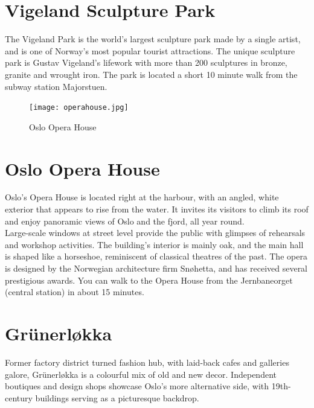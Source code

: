 \documentclass{article}
\begin{document}
\section*{Vigeland Sculpture Park} 

The Vigeland Park is the world's largest sculpture park made by a single artist, and is one of Norway's most popular tourist attractions. The unique sculpture park is Gustav Vigeland's lifework with more than 200 sculptures in bronze, granite and wrought iron. The park is located a short 10 minute walk from the subway station Majorstuen.

\begin{figure}
    \centering
    \texttt{[image: operahouse.jpg]}%
     \caption*{Oslo Opera House }
\end{figure}

\vspace{1cm}

\section*{Oslo Opera House}
Oslo's Opera House is located right at the harbour, with an angled, white exterior that appears to rise from the water. It invites its visitors to climb its roof and enjoy panoramic views of Oslo and the fjord, all year round. \\
Large-scale windows at street level provide the public with glimpses of rehearsals and workshop activities. The building's interior is mainly oak, and the main hall is shaped like a horseshoe, reminiscent of classical theatres of the past. The opera is designed by the Norwegian architecture firm Snøhetta, and has received several prestigious awards. You can walk to the Opera House from the Jernbaneorget (central station) in about 15 minutes.

\clearpage

\section*{Gr\"unerløkka}
Former factory district turned fashion hub, with laid-back cafes and galleries galore, Grünerløkka is a colourful mix of old and new decor. Independent boutiques and design shops showcase Oslo’s more alternative side, with 19th-century buildings serving as a picturesque backdrop.
\end{document}
